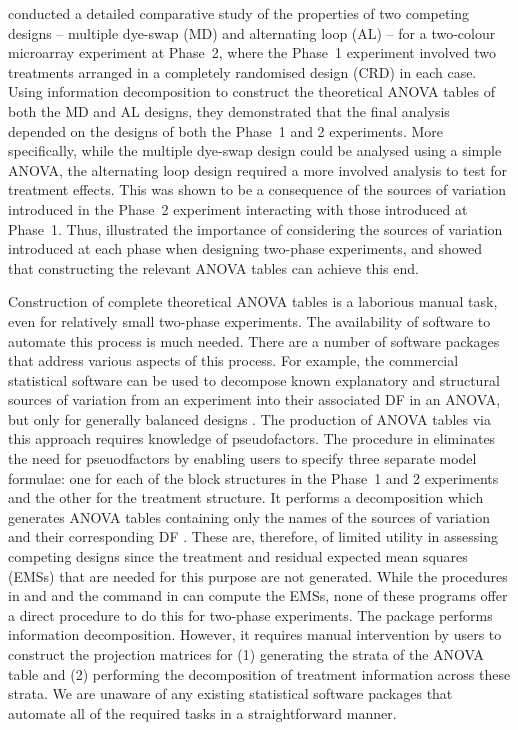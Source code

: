 \documentclass[article]{jss}
\begin{document}
\cite{Jarrett2008} conducted a detailed comparative study of the properties of two competing designs -- multiple dye-swap (MD) and alternating loop (AL) \citep{Churchill2002} -- for a two-colour microarray experiment at Phase~2, where the Phase~1 experiment involved two treatments arranged in a completely randomised design (CRD) in each case. Using information decomposition to construct the theoretical ANOVA tables of both the MD and AL designs, they demonstrated that the final analysis depended on the designs of both the Phase~1 and 2 experiments. More specifically, while the multiple dye-swap design could be analysed using a simple ANOVA, the alternating loop design required a more involved analysis to test for treatment effects. This was shown to be a consequence of the sources of variation introduced in the Phase~2 experiment interacting with those introduced at Phase~1. Thus, \cite{Jarrett2008} illustrated the importance of considering the sources of variation introduced at each phase when designing two-phase experiments, and showed that constructing the relevant ANOVA tables can achieve this end.

Construction of complete theoretical ANOVA tables is a laborious manual task, even for relatively small two-phase experiments. The availability of software to automate this process is much needed. There are a number of software packages that address various aspects of this process. For example, the commercial statistical software  can be used to decompose known explanatory and structural sources of variation from an experiment into their associated DF in an ANOVA, but only for generally balanced designs \citep{Payne2003}. The production of ANOVA tables via this approach requires knowledge of pseudofactors. The  procedure in  eliminates the need for pseuodfactors by enabling users to specify three separate model formulae: one for each of the block structures in the Phase~1 and 2 experiments and the other for the treatment structure. It performs a decomposition which generates ANOVA tables containing only the names of the sources of variation and their corresponding DF \citep{Brien2006a}. These are, therefore, of limited utility in assessing competing designs since the treatment and residual expected mean squares (EMSs) that are needed for this purpose are not generated. While the  procedures in  and  and the  command in  can compute the EMSs, none of these programs offer a direct procedure to do this for two-phase experiments. The   package \citep{Brien2011a} performs information decomposition. However, it requires manual intervention by users to construct the projection matrices for (1) generating the strata of the ANOVA table and (2) performing the decomposition of treatment information across these strata. We are unaware of any existing statistical software packages that automate all of the required tasks in a straightforward manner.
\end{document}
